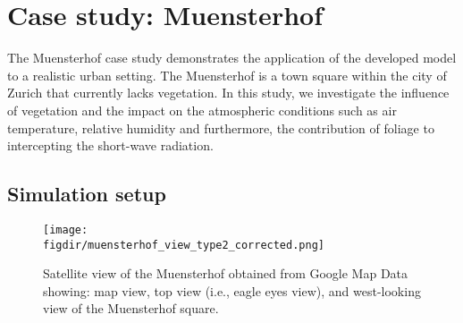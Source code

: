 



 


\section{Case study: Muensterhof}

The Muensterhof case study demonstrates the application of the developed model to a realistic urban setting. The Muensterhof is a town square within the city of Zurich that currently lacks vegetation. In this study, we investigate the influence of vegetation and the impact on the atmospheric conditions such as air temperature, relative humidity and furthermore, the contribution of foliage to intercepting the short-wave radiation. 

\subsection{Simulation setup}
\label{sec:muenstersetup}

\begin{figure}[t]
	\centering
	\texttt{[image: \\figdir/muensterhof\_view\_type2\_corrected.png]}
	\caption{Satellite view of the Muensterhof obtained from Google Map Data showing:  map view,  top view (i.e., eagle eyes view), and  west-looking view of the Muensterhof square.}
	\label{fig:muensterhof_view}
\end{figure}

